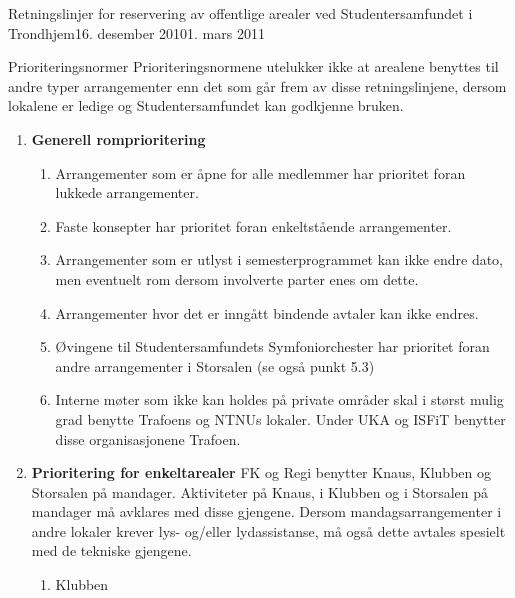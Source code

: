 \begin{instruks}{Retningslinjer for reservering av offentlige arealer
    ved Studentersamfundet i Trondhjem}{16. desember 2010}{1. mars 2011}
    \begin{instruksledd}{Prioriteringsnormer}
        Prioriteringsnormene utelukker ikke at arealene benyttes til andre typer
        arrangementer enn det som går frem av disse
        retningslinjene, dersom lokalene er ledige og Studentersamfundet kan godkjenne
        bruken.
        \begin{enumerate}
            \item \textbf{Generell romprioritering}
                \begin{enumerate}
                    \item Arrangementer som er åpne for alle medlemmer har prioritet
                        foran lukkede arrangementer.
                    \item Faste konsepter har prioritet foran enkeltstående
                        arrangementer.
                    \item Arrangementer som er utlyst i semesterprogrammet kan ikke
                        endre dato, men eventuelt rom dersom
                        involverte parter enes om dette.
                    \item Arrangementer hvor det er inngått bindende avtaler kan ikke
                        endres.
                    \item Øvingene til Studentersamfundets Symfoniorchester har
                        prioritet foran andre arrangementer i Storsalen (se
                        også punkt 5.3)
                    \item Interne møter som ikke kan holdes på private områder skal i
                        størst mulig grad benytte Trafoens og NTNUs
                        lokaler. Under UKA og ISFiT benytter disse organisasjonene
                        Trafoen.
                \end{enumerate}
            \item \textbf{ Prioritering for enkeltarealer}
                FK og Regi benytter Knaus, Klubben og Storsalen på mandager.
                Aktiviteter på Knaus, i Klubben og i Storsalen på
                mandager må avklares med disse gjengene. Dersom mandagsarrangementer i
                andre lokaler krever lys- og/eller
                lydassistanse, må også dette avtales spesielt med de tekniske
                gjengene.
                \begin{enumerate}
                    \item Klubben
                        \begin{enumerate}

\end{enumerate}
\end{enumerate}
\end{enumerate}
\end{instruksledd}
\end{instruks}
